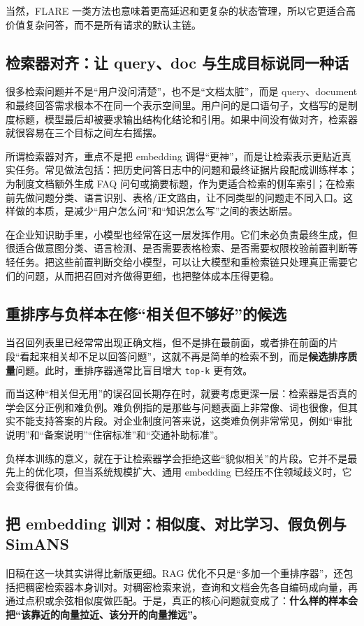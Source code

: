 当然，FLARE 一类方法也意味着更高延迟和更复杂的状态管理，所以它更适合高价值复杂问答，而不是所有请求的默认主链。

\subsection{检索器对齐：让 query、doc 与生成目标说同一种话}
很多检索问题并不是“用户没问清楚”，也不是“文档太脏”，而是 query、document 和最终回答需求根本不在同一个表示空间里。用户问的是口语句子，文档写的是制度标题，模型最后却被要求输出结构化结论和引用。如果中间没有做对齐，检索器就很容易在三个目标之间左右摇摆。

所谓检索器对齐，重点不是把 embedding 调得“更神”，而是让检索表示更贴近真实任务。常见做法包括：把历史问答日志中的问题和最终证据片段配成训练样本；为制度文档额外生成 FAQ 问句或摘要标题，作为更适合检索的侧车索引；在检索前先做问题分类、语言识别、表格/正文路由，让不同类型的问题走不同入口。这样做的本质，是减少“用户怎么问”和“知识怎么写”之间的表达断层。

在企业知识助手里，小模型也经常在这一层发挥作用。它们未必负责最终生成，但很适合做意图分类、语言检测、是否需要表格检索、是否需要权限校验前置判断等轻任务。把这些前置判断交给小模型，可以让大模型和重检索链只处理真正需要它们的问题，从而把召回对齐做得更细，也把整体成本压得更稳。

\subsection{重排序与负样本在修“相关但不够好”的候选}
当召回列表里已经常常出现正确文档，但不是排在最前面，或者排在前面的片段“看起来相关却不足以回答问题”，这就不再是简单的检索不到，而是\textbf{候选排序质量}问题。此时，重排序器通常比盲目增大 \texttt{top-k} 更有效。

而当这种“相关但无用”的误召回长期存在时，就要考虑更深一层：检索器是否真的学会区分正例和难负例。难负例指的是那些与问题表面上非常像、词也很像，但其实不能支持答案的片段。对企业制度问答来说，这类难负例非常常见，例如“审批说明”和“备案说明”“住宿标准”和“交通补助标准”。

负样本训练的意义，就在于让检索器学会拒绝这些“貌似相关”的片段。它并不是最先上的优化项，但当系统规模扩大、通用 embedding 已经压不住领域歧义时，它会变得很有价值。

\subsection{把 embedding 训对：相似度、对比学习、假负例与 SimANS}
旧稿在这一块其实讲得比新版更细。RAG 优化不只是“多加一个重排序器”，还包括把稠密检索器本身训对。对稠密检索来说，查询和文档会先各自编码成向量，再通过点积或余弦相似度做匹配。于是，真正的核心问题就变成了：\textbf{什么样的样本会把“该靠近的向量拉近、该分开的向量推远”。}

